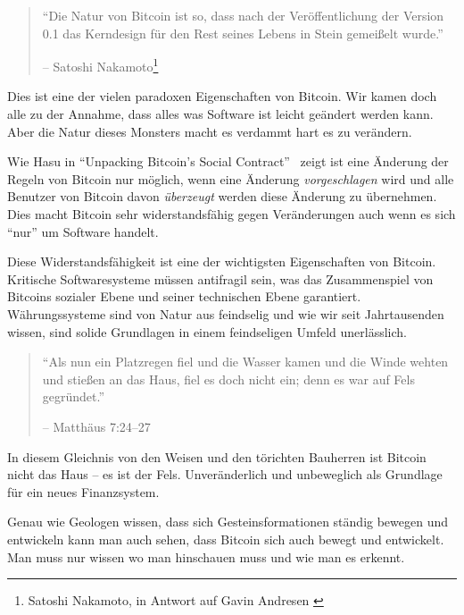 \begin{quotation}\begin{samepage}
\enquote{Die Natur von Bitcoin ist so, dass nach der Veröffentlichung der
Version 0.1 das Kerndesign für den Rest seines Lebens in Stein gemeißelt wurde.}
\begin{flushright} -- Satoshi Nakamoto\footnote{Satoshi Nakamoto, in  Antwort
auf Gavin Andresen \cite{satoshi-centralized-nature}}
\end{flushright}\end{samepage}\end{quotation}

Dies ist eine der vielen paradoxen Eigenschaften von Bitcoin. Wir kamen doch
alle zu der Annahme, dass alles was Software ist leicht geändert werden kann.
Aber die Natur dieses Monsters macht es verdammt hart es zu verändern.

Wie Hasu in \enquote{Unpacking Bitcoin’s Social Contract}~\cite{social-contract}
zeigt ist eine Änderung der Regeln von Bitcoin nur möglich, wenn eine Änderung
\textit{vorgeschlagen} wird und alle Benutzer von Bitcoin davon
\textit{überzeugt} werden diese Änderung zu übernehmen. Dies macht Bitcoin sehr
widerstandsfähig gegen Veränderungen auch wenn es sich \enquote{nur} um Software
handelt.

Diese Widerstandsfähigkeit ist eine der wichtigsten Eigenschaften von Bitcoin.
Kritische Softwaresysteme müssen antifragil sein, was das Zusammenspiel von
Bitcoins sozialer Ebene und seiner technischen Ebene garantiert. Währungssysteme
sind von Natur aus feindselig und wie wir seit Jahrtausenden wissen, sind solide
Grundlagen in einem feindseligen Umfeld unerlässlich.

\begin{quotation}\begin{samepage}
\enquote{Als nun ein Platzregen fiel und die Wasser kamen und die Winde wehten
und stießen an das Haus, fiel es doch nicht ein; denn es war auf Fels
gegründet.}
\begin{flushright} -- Matthäus 7:24--27
\end{flushright}\end{samepage}\end{quotation}

In diesem Gleichnis von den Weisen und den törichten Bauherren ist Bitcoin nicht
das Haus -- es ist der Fels. Unveränderlich und unbeweglich als Grundlage für
ein neues Finanzsystem.

Genau wie Geologen wissen, dass sich Gesteinsformationen ständig bewegen und
entwickeln kann man auch sehen, dass Bitcoin sich auch bewegt und entwickelt.
Man muss nur wissen wo man hinschauen muss und wie man es erkennt.

